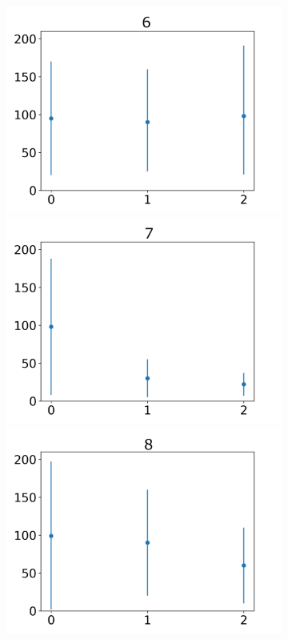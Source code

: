 \documentclass[journal]{IEEEtran}
\begin{document}
{{\begin{figure}[h!]
\begin{subfigure}{0.5\textwidth}
  \includegraphics[scale=0.27]{Images/Average_steps/f.png}
  \centering
  \includegraphics[scale=0.27]{Images/Average_steps/g.png}
  \includegraphics[scale=0.27]{Images/Average_steps/h.png}

\end{subfigure}
\end{figure}}}
\end{document}
